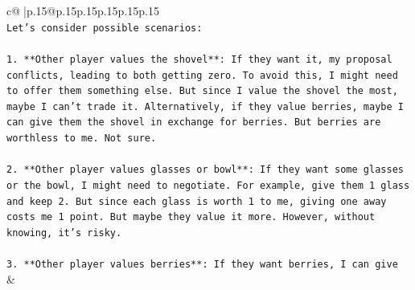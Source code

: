 \documentclass{article}
\begin{document}
{\begin{supertabular}{c@{$\;$}|p{.15\linewidth}@{}p{.15\linewidth}p{.15\linewidth}p{.15\linewidth}p{.15\linewidth}p{.15\linewidth}}
{{{\\ 
\texttt{Let's consider possible scenarios:} \\
\\ 
\texttt{1. **Other player values the shovel**: If they want it, my proposal conflicts, leading to both getting zero. To avoid this, I might need to offer them something else. But since I value the shovel the most, maybe I can't trade it. Alternatively, if they value berries, maybe I can give them the shovel in exchange for berries. But berries are worthless to me. Not sure.} \\
\\ 
\texttt{2. **Other player values glasses or bowl**: If they want some glasses or the bowl, I might need to negotiate. For example, give them 1 glass and keep 2. But since each glass is worth 1 to me, giving one away costs me 1 point. But maybe they value it more. However, without knowing, it's risky.} \\
\\ 
\texttt{3. **Other player values berries**: If they want berries, I can give} \\
            }
        }
    }
    & \\ \\


\end{supertabular}}
\end{document}
